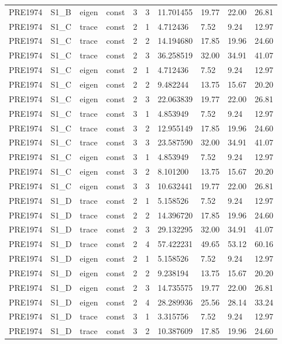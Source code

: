 \begin{tabular}{llllllllll}
PRE1974 & S1\_B & eigen & const & 3 & 3 & 11.701455 & 19.77 & 22.00 & 26.81 \\
PRE1974 & S1\_C & trace & const & 2 & 1 & 4.712436 & 7.52 & 9.24 & 12.97 \\
PRE1974 & S1\_C & trace & const & 2 & 2 & 14.194680 & 17.85 & 19.96 & 24.60 \\
PRE1974 & S1\_C & trace & const & 2 & 3 & 36.258519 & 32.00 & 34.91 & 41.07 \\
PRE1974 & S1\_C & eigen & const & 2 & 1 & 4.712436 & 7.52 & 9.24 & 12.97 \\
PRE1974 & S1\_C & eigen & const & 2 & 2 & 9.482244 & 13.75 & 15.67 & 20.20 \\
PRE1974 & S1\_C & eigen & const & 2 & 3 & 22.063839 & 19.77 & 22.00 & 26.81 \\
PRE1974 & S1\_C & trace & const & 3 & 1 & 4.853949 & 7.52 & 9.24 & 12.97 \\
PRE1974 & S1\_C & trace & const & 3 & 2 & 12.955149 & 17.85 & 19.96 & 24.60 \\
PRE1974 & S1\_C & trace & const & 3 & 3 & 23.587590 & 32.00 & 34.91 & 41.07 \\
PRE1974 & S1\_C & eigen & const & 3 & 1 & 4.853949 & 7.52 & 9.24 & 12.97 \\
PRE1974 & S1\_C & eigen & const & 3 & 2 & 8.101200 & 13.75 & 15.67 & 20.20 \\
PRE1974 & S1\_C & eigen & const & 3 & 3 & 10.632441 & 19.77 & 22.00 & 26.81 \\
PRE1974 & S1\_D & trace & const & 2 & 1 & 5.158526 & 7.52 & 9.24 & 12.97 \\
PRE1974 & S1\_D & trace & const & 2 & 2 & 14.396720 & 17.85 & 19.96 & 24.60 \\
PRE1974 & S1\_D & trace & const & 2 & 3 & 29.132295 & 32.00 & 34.91 & 41.07 \\
PRE1974 & S1\_D & trace & const & 2 & 4 & 57.422231 & 49.65 & 53.12 & 60.16 \\
PRE1974 & S1\_D & eigen & const & 2 & 1 & 5.158526 & 7.52 & 9.24 & 12.97 \\
PRE1974 & S1\_D & eigen & const & 2 & 2 & 9.238194 & 13.75 & 15.67 & 20.20 \\
PRE1974 & S1\_D & eigen & const & 2 & 3 & 14.735575 & 19.77 & 22.00 & 26.81 \\
PRE1974 & S1\_D & eigen & const & 2 & 4 & 28.289936 & 25.56 & 28.14 & 33.24 \\
PRE1974 & S1\_D & trace & const & 3 & 1 & 3.315756 & 7.52 & 9.24 & 12.97 \\
PRE1974 & S1\_D & trace & const & 3 & 2 & 10.387609 & 17.85 & 19.96 & 24.60 \\

\end{tabular}
